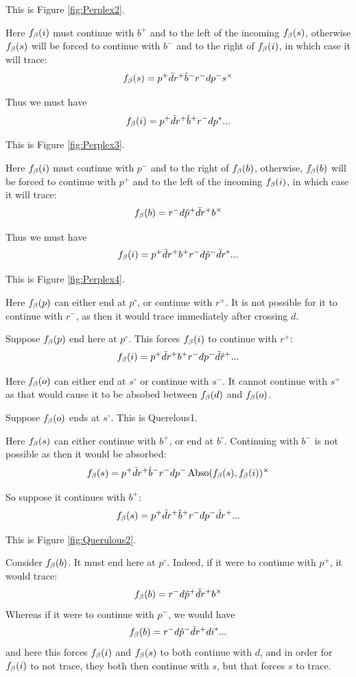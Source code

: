 This is Figure \ref{fig:Perplex2}.

Here $f_\beta(i)$ must continue with $b^+$ and to the left of the incoming $f_\beta(s)$, otherwise $f_\beta(s)$ will be forced to continue with $b^-$ and to the right of $f_\beta(i)$, in which case it will trace:
\[
f_\beta(s) = p^+ \bar{d} r^+ \hat{b}^- r^- d p^- s^\times
\]

Thus we must have
\[
f_\beta(i) = p^+ \bar{d} r^+ \hat{b}^+ r^- d p^*... 
\]

This is Figure \ref{fig:Perplex3}.

Here $f_\beta(i)$ must continue with $p^-$ and to the right of $f_\beta(b)$, otherwise, $f_\beta(b)$ will be forced to continue with $p^+$ and to the left of the incoming $f_\beta(i)$, in which case it will trace:
\[
f_\beta(b) = r^- d \hat{p}^+ \bar{d} r^+ b^\times
\]

Thus we must have
\[
f_\beta(i) = p^+ \bar{d} r^+ b^+ r^- d \hat{p}^- \bar{d} r^*...
\]

This is Figure \ref{fig:Perplex4}.

Here $f_\beta(p)$ can either end at $p^\circ$, or continue with $r^+$. It is not possible for it to continue with $r^-$, as then it would trace immediately after crossing $d$.

\label{Zugzwang}
Suppose $f_\beta(p)$ end here at $p^\circ$. This forces $f_\beta(i)$ to continue with $r^+$:
\[
f_\beta(i) = p^+ \bar{d} r^+ b^+ r^- d p^- \bar{d} \hat{r}^+...
\]

Here $f_\beta(o)$ can either end at $s^\circ$ or continue with $s^-$. It cannot continue with $s^+$ as that would cause it to be absobed between $f_\beta(d)$ and $f_\beta(o)$.

\label{Querulous}
Suppose $f_\beta(o)$ ends at $s^\circ$. This is Querelous1.

Here $f_\beta(s)$ can either continue with $b^+$, or end at $b^\circ$. Continuing with $b^-$ is not possible as then it would be absorbed:
\[
f_\beta(s) = p^+ \bar{d} r^+ \hat{b}^- r^- d p^- \operatorname{Abso}(f_\beta(s), f_\beta(i))^\times
\]

So suppose it continues with $b^+$:
\[
f_\beta(s) = p^+ \bar{d} r^+ \hat{b}^+ r^- d p^- \bar{d} r^+...
\]

This is Figure \ref{fig:Querulous2}.

Consider $f_\beta(b)$. It must end here at $p^\circ$. Indeed, if it were to continue with $p^+$, it would trace:
\[
f_\beta(b) = r^- d \hat{p}^+ \bar{d} r^+ b^\times
\]
Whereas if it were to continue with $p^-$, we would have
\[
f_\beta(b) = r^- d \hat{p}^- \bar{d} r^+ d i^*...
\]
and here this forces $f_\beta(i)$ and $f_\beta(s)$ to both continue with $d$, and in order for $f_\beta(i)$ to not trace, they both then continue with $s$, but that forces $s$ to trace.


